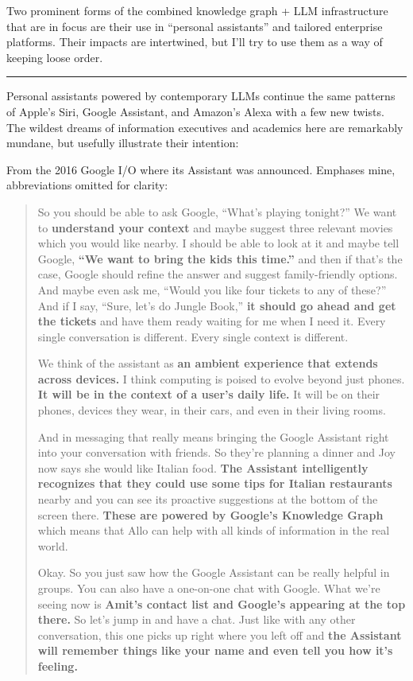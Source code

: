 Two prominent forms of the combined knowledge graph + LLM infrastructure
that are in focus are their use in ``personal assistants'' and tailored
enterprise platforms. Their impacts are intertwined, but I'll try to use
them as a way of keeping loose order.

\begin{center}\rule{0.5\linewidth}{0.5pt}\end{center}

Personal assistants powered by contemporary LLMs continue the same
patterns of Apple's Siri, Google Assistant, and Amazon's Alexa with a
few new twists. The wildest dreams of information executives and
academics here are remarkably mundane, but usefully illustrate their
intention:

From the 2016 Google I/O where its Assistant was announced.
Emphases mine, abbreviations omitted for clarity:

\begin{quote}
So you should be able to ask Google, ``What's playing tonight?'' We want
to \textbf{understand your context} and maybe suggest three relevant
movies which you would like nearby. I should be able to look at it and
maybe tell Google, \textbf{``We want to bring the kids this time.''} and
then if that's the case, Google should refine the answer and suggest
family-friendly options. And maybe even ask me, ``Would you like four
tickets to any of these?'' And if I say, ``Sure, let's do Jungle Book,''
\textbf{it should go ahead and get the tickets} and have them ready
waiting for me when I need it. Every single conversation is different.
Every single context is different.

We think of the assistant as \textbf{an ambient experience that extends
across devices.} I think computing is poised to evolve beyond just
phones. \textbf{It will be in the context of a user's daily life.} It
will be on their phones, devices they wear, in their cars, and even in
their living rooms.

And in messaging that really means bringing the Google Assistant right
into your conversation with friends. So they're planning a dinner and
Joy now says she would like Italian food. \textbf{The Assistant
intelligently recognizes that they could use some tips for Italian
restaurants} nearby and you can see its proactive suggestions at the
bottom of the screen there. \textbf{These are powered by Google's
Knowledge Graph} which means that Allo can help with all kinds of
information in the real world.

Okay. So you just saw how the Google Assistant can be really helpful in
groups. You can also have a one-on-one chat with Google. What we're
seeing now is \textbf{Amit's contact list and Google's appearing at the
top there.} So let's jump in and have a chat. Just like with any other
conversation, this one picks up right where you left off and \textbf{the
Assistant will remember things like your name and even tell you how it's
feeling.} \cite{sGoogle2016Keynote2016} 
\end{quote}

